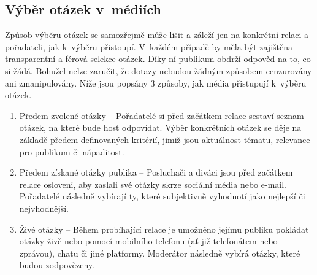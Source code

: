 \subsection*{Výběr otázek v~médiích}
Způsob výběru otázek se samozřejmě může lišit a záleží jen na konkrétní relaci a pořadateli, jak k~výběru přistoupí. V~každém případě by měla být zajištěna transparentní a férová selekce otázek. Díky ní publikum obdrží odpověď na to, co si žádá. Bohužel nelze zaručit, že dotazy nebudou žádným způsobem cenzurovány ani zmanipulovány. Níže jsou popsány 3 způsoby, jak média přistupují k~výběru otázek.
\begin{enumerate}
\item Předem zvolené otázky -- Pořadatelé si před začátkem relace sestaví seznam otázek, na které bude host odpovídat. Výběr konkrétních otázek se děje na základě předem definovaných kritérií, jimiž jsou aktuálnost tématu, relevance pro publikum či nápaditost.

\item Předem získané otázky publika -- Posluchači a diváci jsou před začátkem relace osloveni, aby zaslali své otázky skrze sociální média nebo e-mail. Pořadatelé následně vybírají ty, které subjektivně vyhodnotí jako nejlepší či nejvhodnější.

\item Živé otázky -- Během probíhající relace je umožněno jejímu publiku pokládat otázky živě nebo pomocí mobilního telefonu (ať již telefonátem nebo zprávou), chatu či jiné platformy. Moderátor následně vybírá otázky, které budou zodpovězeny. 
\end{enumerate}

